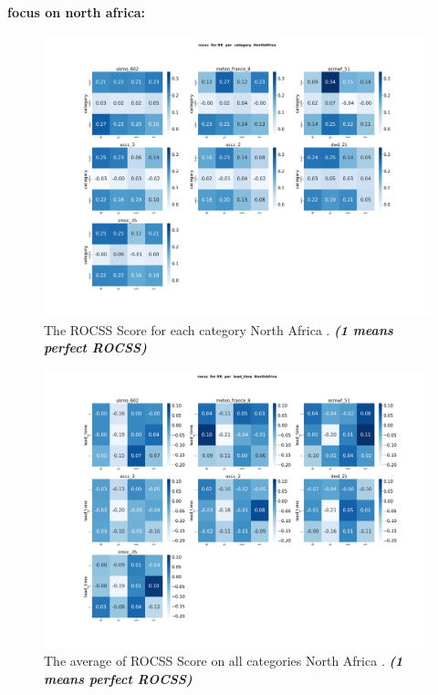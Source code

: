 \paragraph{focus on north africa:}
\begin{figure}[H]
    \centering
    \includegraphics[scale=0.25]{plots/prob/rocss/rocss_RR_category_NorthAfrica.png}
    \caption{The ROCSS Score for each category North Africa . \textbf{\textit{(1 means perfect ROCSS)}}}
\end{figure}


\begin{figure}[H]
    \centering
    \includegraphics[scale=0.25]{plots/prob/rocss/rocss_RR_lead_time_NorthAfrica.png}
    \caption{The average of  ROCSS Score on all categories North Africa   . \textbf{\textit{(1 means perfect ROCSS)}}}
\end{figure}


